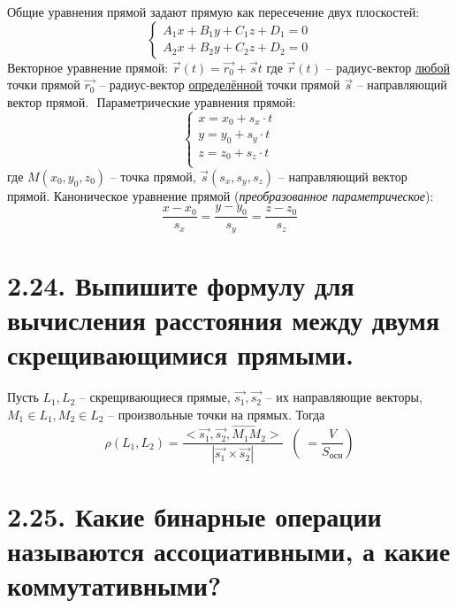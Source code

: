 \documentclass{article}
\begin{document}
Общие уравнения прямой задают прямую как пересечение двух плоскостей:
$$
\begin{cases}
A_1x + B_1y + C_1z + D_1 = 0 \\
A_2x + B_2y + C_2z + D_2 = 0
\end{cases}
$$
Векторное уравнение прямой: $\vec{r}(t) = \vec{r_0} + \vec{s}t$
\newline где $\vec{r}(t)$ -- радиус-вектор \underline{любой} точки прямой
\newline $\vec{r_0}$ -- радиус-вектор \underline{определённой} точки прямой
\newline $\vec{s}$ -- направляющий вектор прямой.
\newline $ $
\newline Параметрические уравнения прямой:
$$
\begin{cases}
x = x_0 + s_x\cdot t \\
y = y_0 + s_y\cdot t \\
z = z_0 + s_z\cdot t \\
\end{cases}
$$
где $M(x_0, y_0, z_0)$ -- точка прямой, $\vec{s}(s_x, s_y, s_z)$ -- направляющий вектор прямой.
\newline Каноническое уравнение прямой (\textit{преобразованное параметрическое}):
$$
\frac{x - x_0}{s_x} = \frac{y - y_0}{s_y} = \frac{z - z_0}{s_z}
$$

\section*{\LARGE 2.24. Выпишите формулу для вычисления расстояния между двумя скрещивающимися прямыми.  }

Пусть $L_1, L_2$ -- скрещивающиеся прямые, $\vec{s_1}, \vec{s_2}$ -- их направляющие векторы, $M_1 \in L_1, M_2 \in L_2$ -- произвольные точки на прямых. Тогда 
$$
\rho(L_1, L_2) = \frac{<\vec{s_1}, \vec{s_2}, \vec{M_1M_2}>}{|\vec{s_1} \times \vec{s_2}|} \;\; (\;= \frac{V}{S_{\mbox{осн}}})
$$

\section*{\LARGE 2.25. Какие бинарные операции называются ассоциативными, а какие коммутативными?  }
\end{document}
